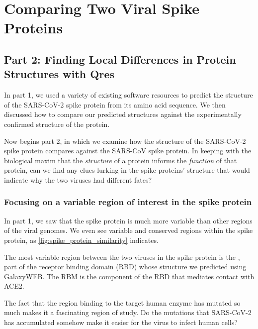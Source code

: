 \chapter[Comparing Two Viral Spike Proteins]{Comparing Two Viral Spike Proteins}
\label{chapter:coronavirus_2}
\renewcommand{\chaptertitle}{Comparing Two Viral Spike Proteins}

\FloatBarrier
{}

\section{Part 2: Finding Local Differences in Protein Structures with Qres}
\label{sec:multiseq}

In part 1, we used a variety of existing software resources to predict the structure of the SARS-CoV-2 spike protein from its amino acid sequence. We then discussed how to compare our predicted structures against the experimentally confirmed structure of the protein.

Now begins part 2, in which we examine how the structure of the SARS-CoV-2 spike protein compares against the SARS-CoV spike protein. In keeping with the biological maxim that the \textit{structure} of a protein informs the \textit{function} of that protein, can we find any clues lurking in the spike proteins' structure that would indicate why the two viruses had different fates?

\FloatBarrier
{}
\subsection{Focusing on a variable region of interest in the spike protein}

In part 1, we saw that the spike protein is much more variable than other regions of the viral genomes. We even see variable and conserved regions within the spike protein, as \autoref{fig:spike_protein_similarity} indicates.

The most variable region between the two viruses in the spike protein is the , part of the receptor binding domain (RBD) whose structure we predicted using GalaxyWEB. The RBM is the component of the RBD that mediates contact with ACE2.

The fact that the region binding to the target human enzyme has mutated so much makes it a fascinating region of study. Do the mutations that SARS-CoV-2 has accumulated somehow make it easier for the virus to infect human cells?

